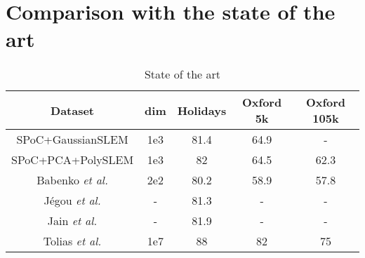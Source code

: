 \section{Comparison with the state of the art}
\label{sec:sota}
\begin{table}[!h]
    \centering
    \caption{State of the art}
    \begin{tabular}{|c|c|c|c|c|}
    \hline
    Dataset & dim &\textbf{Holidays} & \textbf{Oxford 5k} & \textbf{Oxford 105k}\\
    \hline
    \hline
    SPoC+GaussianSLEM                           & 1e3  &  81.4   &  64.9  &   -  \\
    SPoC+PCA+PolySLEM                           & 1e3  &  82    &   64.5  &  62.3 \\
    Babenko \textit{et al.} \cite{babenko15}    & 2e2  &  80.2  &   58.9  &  57.8 \\
    J\'egou \textit{et al.} \cite{sota1}        & -    &  81.3  &    -    &   -   \\
    Jain \textit{et al. } \cite{JaJeGro11}      &   -  &  81.9  &    -    &   -   \\
    Tolias \textit{et al.} \cite{Tolias13}      & 1e7  &  88    &   82    &  75   \\
    \hline
    \end{tabular}
    \label{tab:sota}
\end{table}


